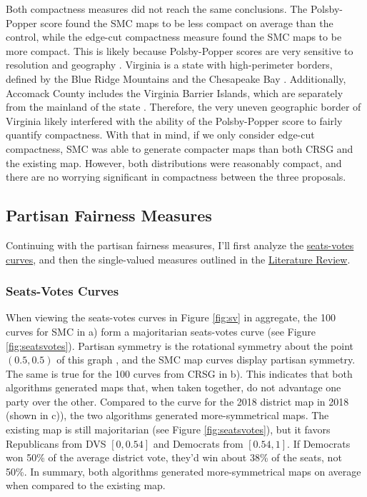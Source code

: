 Both compactness measures did not reach the same conclusions. The Polsby-Popper score found the SMC maps to be less compact on average than the control, while the edge-cut compactness measure found the SMC maps to be more compact. This is likely because Polsby-Popper scores are very sensitive to resolution and geography \parencite{mccartan2020}. Virginia is a state with high-perimeter borders, defined by the Blue Ridge Mountains and the Chesapeake Bay \parencite{unitedstatesgeologicalsurvey2021}. Additionally, Accomack County includes the Virginia Barrier Islands, which are separately from the mainland of the state \parencite{unitedstatesgeologicalsurvey2021}. Therefore, the very uneven geographic border of Virginia likely interfered with the ability of the Polsby-Popper score to fairly quantify compactness. With that in mind, if we only consider edge-cut compactness, SMC was able to generate compacter maps than both CRSG and the existing map. However, both distributions were reasonably compact, and there are no worrying significant in compactness between the three proposals. 

\subsection{Partisan Fairness Measures}

Continuing with the partisan fairness measures, I'll first analyze the \hyperref[sec:seatsvotes]{seats-votes curves}, and then the single-valued measures outlined in the \hyperref[sec:litreview]{Literature Review}. 

\subsubsection{Seats-Votes Curves}

When viewing the seats-votes curves in Figure \ref{fig:sv} in aggregate, the 100 curves for SMC in a) form a majoritarian seats-votes curve (see Figure \ref{fig:seatsvotes}). Partisan symmetry is the rotational symmetry about the point $(0.5, 0.5)$ of this graph \parencite{katz2020}, and the SMC map curves display partisan symmetry. The same is true for the 100 curves from CRSG in b). This indicates that both algorithms generated maps that, when taken together, do not advantage one party over the other. Compared to the curve for the 2018 district map in 2018 (shown in c)), the two algorithms generated more-symmetrical maps. The existing map is still majoritarian (see Figure \ref{fig:seatsvotes}), but it favors Republicans from DVS $[0, 0.54]$ and Democrats from $[0.54, 1]$. If Democrats won 50\% of the average district vote, they'd win about 38\% of the seats, not 50\%. In summary, both algorithms generated more-symmetrical maps on average when compared to the existing map. 

